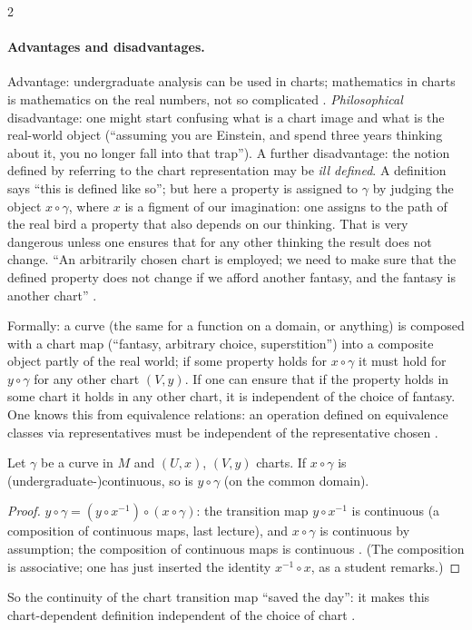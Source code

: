 \begin{paracol}{2}
\paragraph{Advantages and disadvantages.} Advantage: undergraduate analysis can be used in charts; mathematics in charts is mathematics on the real numbers, not so complicated .
\emph{Philosophical} disadvantage: one might start confusing what is a chart image and what is the real-world object (``assuming you are Einstein, and spend three years thinking about it, you no longer fall into that trap''). A further disadvantage:
the notion defined by referring to the chart representation may be \emph{ill defined}. A definition says ``this is defined like so''; but here a property is assigned to $\gamma$ by judging the object $x\circ\gamma$, where $x$ is a figment of our imagination: one assigns to the path of the real bird a property that
also depends on our thinking. That is very dangerous unless one ensures that for any other thinking the result does not change. ``An arbitrarily chosen chart is employed; we need to make sure that the defined property does not change if we afford another fantasy, and the fantasy is another chart''
.

Formally: a curve (the same for a function on a domain, or anything) is composed with a chart map (``fantasy, arbitrary choice, superstition'') into a composite object partly of the real world; if some property holds for $x\circ\gamma$ it must hold for $y\circ\gamma$ for any other chart $(V,y)$.
If one can ensure that if the property holds in some chart it holds in any other chart, it is independent of the choice of fantasy. One knows this from equivalence relations: an operation defined on equivalence classes via representatives must be independent of the representative chosen
.

\begin{proposition}\label{prop:c02-curve-indep}
Let $\gamma$ be a curve in $M$ and $(U,x)$, $(V,y)$ charts. If $x\circ\gamma$ is (undergraduate-)continuous, so is $y\circ\gamma$ (on the common domain).
\end{proposition}
\begin{proof}
$y\circ\gamma=(y\circ x^{-1})\circ(x\circ\gamma)$: the transition map $y\circ x^{-1}$ is continuous (a composition of continuous maps, last lecture), and $x\circ\gamma$ is continuous by assumption; the composition of continuous maps is continuous
. (The composition is associative; one has just inserted the identity $x^{-1}\circ x$, as a student remarks.)
\end{proof}
So the continuity of the chart transition map ``saved the day'': it makes this chart-dependent definition independent of the choice of chart .


\end{paracol}
